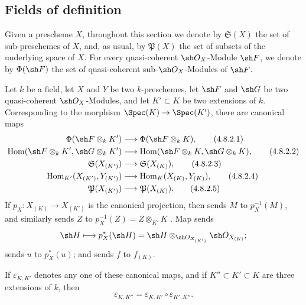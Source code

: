 \subsection{Fields of definition}
\label{subsection:IV.4.8}

\begin{env}[4.8.1]
\label{IV.4.8.1}
Given a prescheme $X$, throughout this section we denote by
$\mathfrak S(X)$ the set of sub-preschemes of $X$, and, as usual, by
$\mathfrak P(X)$ the set of subsets of the underlying space of $X$.
For every quasi-coherent $\sh O_X$-Module $\sh F$, we denote by
$\Phi(\sh F)$ the set of quasi-coherent sub-$\sh O_X$-Modules of
$\sh F$.
\end{env}

\begin{env}[4.8.2]
\label{IV.4.8.2}
Let $k$ be a field, let $X$ and $Y$ be two $k$-preschemes, let
$\sh F$ and $\sh G$ be two quasi-coherent $\sh O_X$-Modules, and let
$K'\subset K$ be two extensions of $k$.
Corresponding to the morphism $\Spec(K)\to\Spec(K')$, there are
canonical maps
\begin{align}
\Phi(\sh F\otimes_kK')
  &\longrightarrow \Phi(\sh F\otimes_kK),
\tag{4.8.2.1}
\label{IV.4.8.2.1}\\
\operatorname{Hom}(\sh F\otimes_kK',\sh G\otimes_kK')
  &\longrightarrow
   \operatorname{Hom}(\sh F\otimes_kK,\sh G\otimes_kK),
\tag{4.8.2.2}
\label{IV.4.8.2.2}\\
\mathfrak S(X_{(K')})
  &\longrightarrow \mathfrak S(X_{(K)}),
\tag{4.8.2.3}
\label{IV.4.8.2.3}\\
\operatorname{Hom}_{K'}(X_{(K')},Y_{(K')})
  &\longrightarrow \operatorname{Hom}_{K}(X_{(K)},Y_{(K)}),
\tag{4.8.2.4}
\label{IV.4.8.2.4}\\
\mathfrak P(X_{(K')})
  &\longrightarrow \mathfrak P(X_{(K)}).
\tag{4.8.2.5}
\label{IV.4.8.2.5}
\end{align}
If $p_X:X_{(K)}\to X_{(K')}$ is the canonical projection, then
 sends $M$ to $p_X^{-1}(M)$, and similarly
 sends $Z$ to
$p_X^{-1}(Z)=Z\otimes_{K'}K$ .
Map  sends
\[
\sh H\longmapsto
p_X^*(\sh H)
=
\sh H\otimes_{\sh O_{X_{(K')}}}\sh O_{X_{(K)}};
\]
 sends $u$ to $p_X^*(u)$; and
 sends $f$ to $f_{(K)}$.

If $\varepsilon_{K,K'}$ denotes any one of these canonical maps, and if
$K''\subset K'\subset K$ are three extensions of $k$, then
\begin{equation}
\varepsilon_{K,K''}=\varepsilon_{K,K'}\circ\varepsilon_{K',K''}.
\tag{4.8.2.6}
\label{IV.4.8.2.6}
\end{equation}
\end{env}

